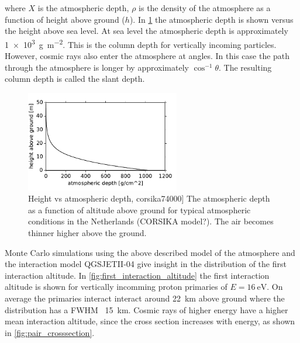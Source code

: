where $X$ is the atmospheric depth, $\rho$ is the density of the atmosphere as a function of height above ground ($h$). In \cref{fig:atmospheric_depth} the atmospheric depth is shown versus the height above sea level. At sea level the atmospheric depth is approximately \SI{1e3}{\gram\per\meter\squared}. This is the column depth for vertically incoming particles. However, cosmic rays also enter the atmosphere at angles. In this case the path through the atmosphere is longer by approximately $\cos^{-1} \theta$. The resulting column depth is called the slant depth.

\begin{figure}
    \centering
    \includegraphics[width=0.6\textwidth]
                    {plots/cosmic-rays/atmospheric_depth}
    \caption{Height vs atmospheric depth, corsika74000]
The atmospheric depth as a function of altitude above ground for typical atmospheric conditions in the Netherlands (CORSIKA model?). The air becomes thinner higher above the ground.}
    \label{fig:atmospheric_depth}
\end{figure}

Monte Carlo simulations using the above described model of the atmosphere and the interaction model QGSJETII-04 give insight in the distribution of the first interaction altitude. In \cref{fig:first_interaction_altitude} the first interaction altitude is shown for vertically incomming proton primaries of $E = \SI{16}{\eV}$. On average the primaries interact interact around \SI{22}{\kilo\meter} above ground where the distribution has a FWHM ~\SI{15}{\kilo\meter}. Cosmic rays of higher energy have a higher mean interaction altitude, since the cross section increases with energy, as shown in \cref{fig:pair_crosssection}.

